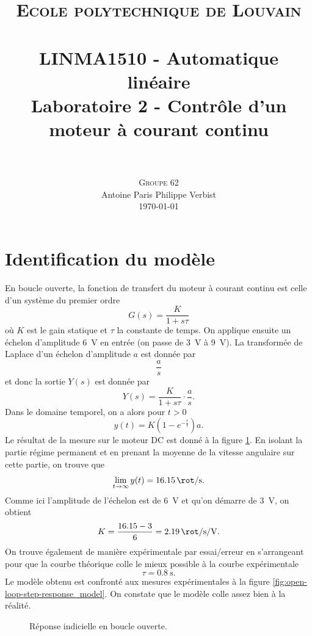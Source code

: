 \documentclass[frenchb, paper=a4, fontsize=11pt]{scrartcl}
\title{
		\usefont{OT1}{bch}{b}{n}
		\normalfont \normalsize \textsc{Ecole polytechnique de Louvain} \\ [25pt]
		\horrule{0.5pt} \\[0.4cm]
		\large LINMA1510 - Automatique linéaire\\
		\huge Laboratoire 2 - Contrôle d'un moteur à courant continu \\
		\horrule{1.5pt} \\[0.5cm]
}
\author{
		\normalfont
		\textsc{Groupe 62}\\
      	Antoine Paris\hspace{0.6cm} Philippe Verbist \\	
       	\normalsize
        \today
}
\date{}
\numberwithin{equation}{section}					%
\numberwithin{figure}{section}					%
\numberwithin{table}{section}						%
\begin{document}
\maketitle

\section{Identification du modèle}
En boucle ouverte, la fonction de transfert du moteur à courant
continu est celle d'un système du premier ordre
\begin{equation}
	G(s) = \frac{K}{1+s\tau}
\end{equation}
où $K$ est le gain statique et $\tau$ la constante de temps.
On applique ensuite un échelon d'amplitude \SI{6}{\volt} en
entrée (on passe de \SI{3}{\volt} à \SI{9}{\volt}). La
transformée de Laplace d'un échelon d'amplitude $a$ est donnée
par
\begin{equation}
	\frac{a}{s}
\end{equation}
et donc la sortie $Y(s)$ est donnée par
\begin{equation}
	Y(s) = \frac{K}{1+s\tau}\cdot\frac{a}{s}.
\end{equation}
Dans le domaine temporel, on a alors pour $t > 0$
\begin{equation}
	y(t) = K(1-e^{-\frac{t}{\tau}})a.
\end{equation}
Le résultat de la mesure sur le moteur DC est donné à la figure
\ref{fig:open-loop-step-response}. En isolant la partie régime
permanent et en prenant la moyenne de la vitesse angulaire sur
cette partie, on trouve que
\begin{equation}
	\lim_{t\to\infty} y(t) = \SI{16.15}{\rot\per\second}.
\end{equation}
Comme ici l'amplitude de l'échelon est de \SI{6}{\volt} et qu'on
démarre de \SI{3}{\volt}, on obtient
\begin{equation}
	K = \frac{16.15-3}{6} = \SI{2.19}{\rot\per\second\per\volt}.
\end{equation}
On trouve également de manière expérimentale par essai/erreur en
s'arrangeant pour que la courbe théorique colle le mieux possible
à la courbe expérimentale
\begin{equation}
	\tau = \SI{0.8}{\second}.
\end{equation}
Le modèle obtenu est confronté aux mesures expérimentales à la
figure \ref{fig:open-loop-step-response_model}. On constate que
le modèle colle assez bien à la réalité.

\begin{figure}[ht]
	\centering
	
	\caption{Réponse indicielle en boucle ouverte.}
	\label{fig:open-loop-step-response}
\end{figure}
\end{document}
